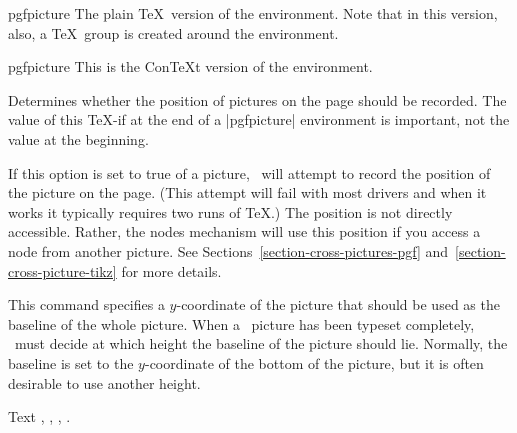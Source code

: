 \begin{plainenvironment}{{pgfpicture}}
  The plain \TeX\ version of the environment. Note that in this
  version, also, a \TeX\ group is created around the environment.
\end{plainenvironment}

\begin{contextenvironment}{{pgfpicture}}
  This is the Con\TeX t version of the environment.
\end{contextenvironment}


{\let\ifpgfrememberpicturepositiononpage=\relax
\begin{command}{\ifpgfrememberpicturepositiononpage}
  Determines whether the position of pictures on the page should be
  recorded. The value of this \TeX-if at the end of a |{pgfpicture}|
  environment is important, not the value at the beginning.

  If this option is set to true of a picture, \pgfname\ will attempt
  to record the position of the picture on the page. (This attempt
  will fail with most drivers and when it works it typically requires
  two runs of \TeX.) The position is not directly accessible. Rather,
  the nodes mechanism will use this position if you access a node from
  another picture. See Sections~\ref{section-cross-pictures-pgf}
  and~\ref{section-cross-picture-tikz} for more details. 
\end{command}
}


\makeatletter
\begin{command}{\pgfsetbaseline{}}
  This command specifies a $y$-coordinate of the picture that should
  be used as the baseline of the whole picture. When a \pgfname\
  picture has been typeset completely, \pgfname\ must decide at which
  height the baseline of the picture should lie. Normally, the
  baseline is set to the $y$-coordinate of the bottom of the picture,
  but it is often desirable to use another height.

\begin{codeexample}[]
Text ,
     ,
     ,
     .
\end{codeexample}
\end{command}

